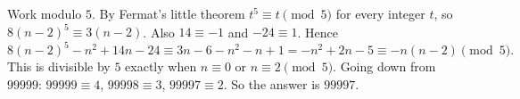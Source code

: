 Work modulo $5$. By Fermat's little theorem $t^5\equiv t\pmod5$ for every integer $t$, so $8(n-2)^5\equiv3(n-2)$. Also $14\equiv-1$ and $-24\equiv1$. Hence
\[
8(n-2)^5-n^2+14n-24\equiv3n-6-n^2-n+1=-n^2+2n-5\equiv-n(n-2)\pmod5 .
\]
This is divisible by $5$ exactly when $n\equiv0$ or $n\equiv2\pmod5$. Going down from $99999$: $99999\equiv4$, $99998\equiv3$, $99997\equiv2$. So the answer is $\boxed{99997}$.

